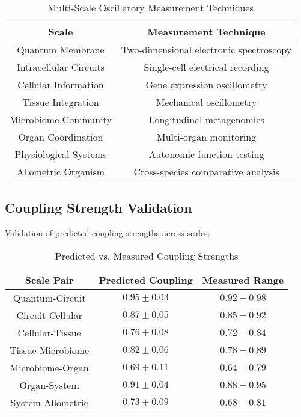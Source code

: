 \documentclass[twocolumn]{article}
\begin{document}
\begin{table}[H]
\centering
\caption{Multi-Scale Oscillatory Measurement Techniques}
\begin{tabular}{|c|c|}
\hline
Scale & Measurement Technique \\
\hline
Quantum Membrane & Two-dimensional electronic spectroscopy \\
Intracellular Circuits & Single-cell electrical recording \\
Cellular Information & Gene expression oscillometry \\
Tissue Integration & Mechanical oscillometry \\
Microbiome Community & Longitudinal metagenomics \\
Organ Coordination & Multi-organ monitoring \\
Physiological Systems & Autonomic function testing \\
Allometric Organism & Cross-species comparative analysis \\
\hline
\end{tabular}
\end{table}

\subsection{Coupling Strength Validation}

Validation of predicted coupling strengths across scales:

\begin{table}[H]
\centering
\caption{Predicted vs. Measured Coupling Strengths}
\begin{tabular}{|c|c|c|}
\hline
Scale Pair & Predicted Coupling & Measured Range \\
\hline
Quantum-Circuit & $0.95 \pm 0.03$ & $0.92-0.98$ \\
Circuit-Cellular & $0.87 \pm 0.05$ & $0.85-0.92$ \\
Cellular-Tissue & $0.76 \pm 0.08$ & $0.72-0.84$ \\
Tissue-Microbiome & $0.82 \pm 0.06$ & $0.78-0.89$ \\
Microbiome-Organ & $0.69 \pm 0.11$ & $0.64-0.79$ \\
Organ-System & $0.91 \pm 0.04$ & $0.88-0.95$ \\
System-Allometric & $0.73 \pm 0.09$ & $0.68-0.81$ \\
\hline
\end{tabular}
\end{table}
\end{document}
